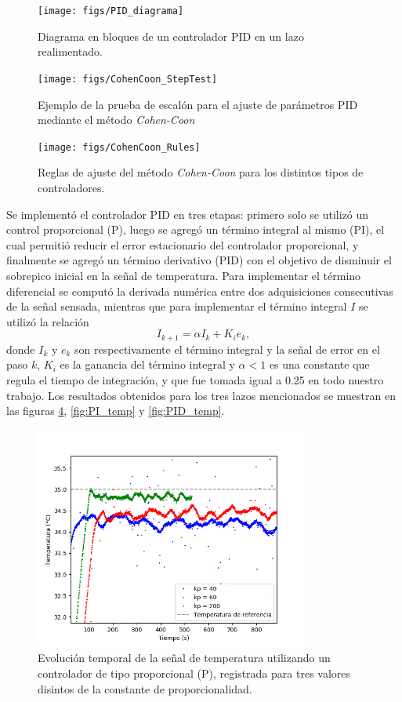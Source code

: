 \documentclass[a4paper,11pt]{article}
\begin{document}
\begin{figure}[H]
\centering
\texttt{[image: figs/PID\_diagrama]}
\caption{Diagrama en bloques de un controlador PID en un lazo realimentado.}
\label{fig:PID_diagrama}
\end{figure}

\begin{figure}[H]
\centering
\texttt{[image: figs/CohenCoon\_StepTest]}
\caption{Ejemplo de la prueba de escalón para el ajuste de parámetros PID mediante el
método \emph{Cohen-Coon}}
\label{fig:CohenCoon_StepTest}
\end{figure}

\begin{figure}[!ht]
\centering
\texttt{[image: figs/CohenCoon\_Rules]}
\caption{Reglas de ajuste del método \emph{Cohen-Coon} para los
\label{fig:CohenCoon_Rules}
distintos tipos de controladores.}
\end{figure}

Se implementó el controlador PID en tres etapas: primero solo se utilizó
un control proporcional (P), luego se agregó un término integral al
mismo (PI), el cual permitió reducir el error estacionario del controlador
proporcional, y finalmente se agregó un término derivativo (PID) con el
objetivo de disminuir el sobrepico inicial en la señal de temperatura. Para implementar el término diferencial se computó la derivada numérica entre dos adquisiciones consecutivas de la señal sensada, mientras que para implementar el término integral $I$ se utilizó la relación
\begin{equation}
	I_{k+1} = \alpha I_k + K_i e_k,
\end{equation}
donde $I_k$ y $e_k$ son respectivamente el término integral y la señal de error en el paso $k$, $K_i$ es la ganancia del término integral y $\alpha<1$ es una constante que regula el tiempo de integración, y que fue tomada igual a \SI{0.25}{} en todo nuestro trabajo. Los resultados obtenidos para los tres lazos mencionados se muestran en las figuras \ref{fig:P_temp}, \ref{fig:PI_temp} y \ref{fig:PID_temp}.

\begin{figure}[!h]
\centering
\includegraphics[width=0.8\textwidth]{figs/P_temp}
\caption{Evolución temporal de la señal de temperatura utilizando
un controlador de tipo proporcional (P), registrada para tres valores
disintos de la constante de proporcionalidad.}
\label{fig:P_temp}
\end{figure}
\end{document}
